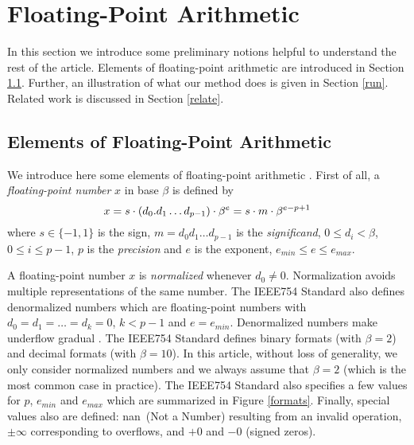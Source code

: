
\section{Floating-Point Arithmetic}
\label{ieee}

In this section we introduce some preliminary notions helpful to understand the rest of the article. Elements of floating-point arithmetic are introduced in Section \ref{arith}.
Further, an illustration of what our method does is given in Section \ref{run}.
Related work is discussed in Section \ref{relate}.

\subsection{Elements of Floating-Point Arithmetic}
\label{arith}

We introduce here some elements of floating-point arithmetic \cite{IEEE754,Mul10}. First of all, a
{\it floating-point number} $x$ in base $\beta$ is defined by
\begin{equation}
\label{fpnum}\small
x = s \cdot (d_0.d_1\ldots d_{p-1}) \cdot \beta^e = s\cdot m \cdot \beta^{e-p+1}
\end{equation}
where 
 $s\in \{-1,1\}$ is the sign, 
$m=d_0d_1\ldots d_{p-1}$ is the
{\it significand}, $0\le d_i< \beta$, $0\le i\le p-1$, 
 $p$ is the
{\it precision} and  $e$ is the exponent, $e_{min}\le e \le e_{max}$.

A floating-point number $x$ is {\it normalized} whenever $d_0\not= 0$.  Normalization
avoids multiple representations of the same number.
The IEEE754 Standard also defines denormalized numbers which are floating-point
numbers with $d_0=d_1=\ldots=d_k=0$, $k< p-1$ and $e=e_{min}$.  Denormalized numbers make underflow gradual \cite{Mul10}.
The IEEE754 Standard defines binary formats (with $\beta=2$) and decimal formats (with $\beta=10$). In this article,
without loss of generality, we only consider normalized numbers and we always assume that $\beta=2$ (which is the most common case in practice).
The IEEE754 Standard also specifies a few
values for $p$, $e_{min}$ and $e_{max}$ which are summarized in Figure \ref{formats}.
Finally,  special values also are defined:
\textsf{nan}\ (Not a Number) resulting from an invalid operation,
 $\pm\infty$ corresponding to overflows,
and $+0$ and $-0$ (signed zeros).

